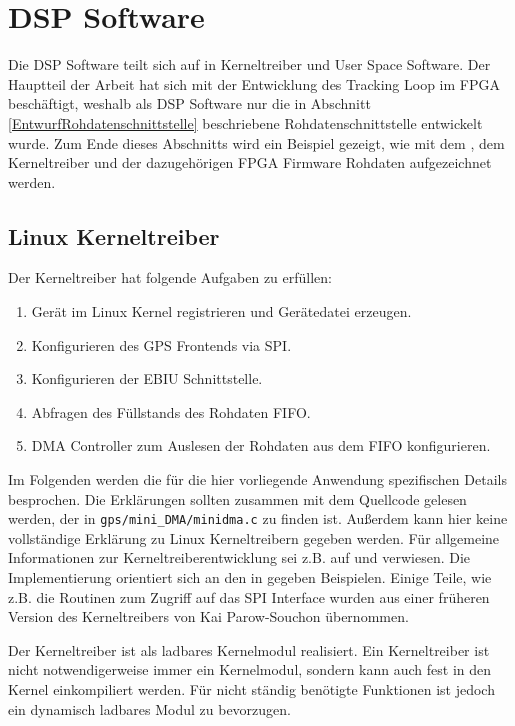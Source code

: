 \section{DSP Software}
Die DSP Software teilt sich auf in Kerneltreiber und User Space Software. Der Hauptteil der Arbeit hat sich mit der Entwicklung des Tracking Loop im FPGA beschäftigt, weshalb als DSP Software nur die in Abschnitt \ref{EntwurfRohdatenschnittstelle} beschriebene Rohdatenschnittstelle entwickelt wurde. Zum Ende dieses Abschnitts wird ein Beispiel gezeigt, wie mit dem \comboard, dem Kerneltreiber und der dazugehörigen FPGA Firmware Rohdaten aufgezeichnet werden.

\subsection{Linux Kerneltreiber}\label{Kerneltreiber}
Der Kerneltreiber hat folgende Aufgaben zu erfüllen:
\begin{enumerate}
    \item Gerät im Linux Kernel registrieren und Gerätedatei erzeugen. %
    \item Konfigurieren des GPS Frontends via SPI. %
    \item Konfigurieren der EBIU Schnittstelle. %
    \item Abfragen des Füllstands des Rohdaten FIFO. %
    \item DMA Controller zum Auslesen der Rohdaten aus dem FIFO konfigurieren. %
\end{enumerate}

Im Folgenden werden die für die hier vorliegende Anwendung spezifischen Details besprochen. Die Erklärungen sollten zusammen mit dem Quellcode gelesen werden, der in \lstinline$gps/mini_DMA/minidma.c$ zu finden ist. Außerdem kann hier keine vollständige Erklärung zu Linux Kerneltreibern  gegeben werden. Für allgemeine  Informationen zur Kerneltreiberentwicklung sei z.B. auf \cite{LinuxDeviceDrivers}  und \cite{quade2015linux} verwiesen. Die Implementierung orientiert sich an den in \cite{quade2015linux} gegeben Beispielen. Einige Teile, wie z.B. die Routinen zum Zugriff auf das SPI Interface wurden aus einer früheren Version des Kerneltreibers von Kai Parow-Souchon übernommen.

Der Kerneltreiber ist als ladbares Kernelmodul realisiert. Ein Kerneltreiber ist nicht notwendigerweise immer ein Kernelmodul, sondern kann auch fest in den Kernel einkompiliert werden. Für nicht ständig benötigte Funktionen ist jedoch ein dynamisch ladbares Modul zu bevorzugen.

